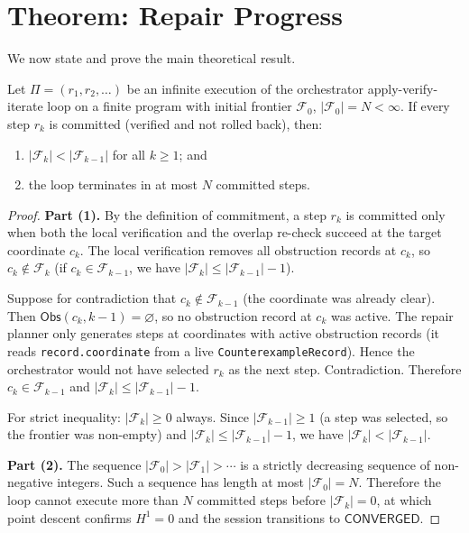 \documentclass[11pt]{article}
\newcommand{\RF}{\mathcal{F}}               %
\begin{document}
\section{Theorem: Repair Progress}
\label{sec:theorem}

We now state and prove the main theoretical result.

\begin{theorem}
\label{thm:progress}
Let $\Pi = (r_1, r_2, \ldots)$ be an infinite execution of the orchestrator
apply-verify-iterate loop on a finite program with initial frontier
$\RF_0$, $|\RF_0| = N < \infty$.  If every step $r_k$ is committed
(\ie verified and not rolled back), then:
\begin{enumerate}
  \item $|\RF_k| < |\RF_{k-1}|$ for all $k \geq 1$; and
  \item the loop terminates in at most $N$ committed steps.
\end{enumerate}
\end{theorem}

\begin{proof}
\textbf{Part (1).}
By the definition of commitment, a step $r_k$ is committed only when both
the local verification and the overlap re-check succeed at the target
coordinate $c_k$.  The local verification removes all obstruction records at
$c_k$, so $c_k \notin \RF_k$ (if $c_k \in \RF_{k-1}$, we have
$|\RF_k| \leq |\RF_{k-1}| - 1$).

Suppose for contradiction that $c_k \notin \RF_{k-1}$ (the coordinate was
already clear).  Then $\mathsf{Obs}(c_k, k-1) = \varnothing$, so no
obstruction record at $c_k$ was active.  The repair planner only generates
steps at coordinates with active obstruction records (it reads
\texttt{record.coordinate} from a live \texttt{CounterexampleRecord}).
Hence the orchestrator would not have selected $r_k$ as the next step.
Contradiction.  Therefore $c_k \in \RF_{k-1}$ and $|\RF_k| \leq |\RF_{k-1}| - 1$.

For strict inequality: $|\RF_k| \geq 0$ always.  Since $|\RF_{k-1}| \geq 1$
(a step was selected, so the frontier was non-empty) and
$|\RF_k| \leq |\RF_{k-1}| - 1$, we have $|\RF_k| < |\RF_{k-1}|$.

\textbf{Part (2).}
The sequence $|\RF_0| > |\RF_1| > \cdots$ is a strictly decreasing sequence
of non-negative integers.  Such a sequence has length at most $|\RF_0| = N$.
Therefore the loop cannot execute more than $N$ committed steps before
$|\RF_k| = 0$, at which point descent confirms $H^1 = 0$ and the session
transitions to $\mathsf{CONVERGED}$.
\end{proof}
\end{document}
